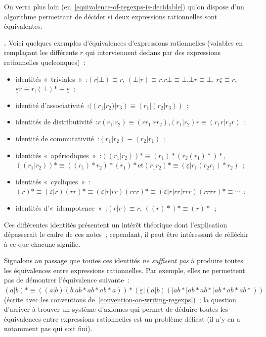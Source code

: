 \documentclass[12pt,a4paper]{article}
\theoremstyle{definition}
\newcommand\thingy{%
\refstepcounter{comcnt}\medskip\noindent\textbf{\thecomcnt.} }
\begin{document}
On verra plus loin (en \ref{equivalence-of-regexps-is-decidable})
qu'on dispose d'un algorithme permettant de décider si deux
expressions rationnelles sont équivalentes.

{\footnotesize\thingy\label{regexp-identities} Voici quelques exemples
  d'équivalences d'expressions rationnelles (valables en remplaçant
  les différents $r$ qui interviennent dedans par des expressions
  rationnelles quelconques) :

\begin{itemize}
\item identités « triviales » :\quad $(r|\bot)\equiv r$,\quad
  $(\bot|r)\equiv r$,\quad $r\bot\equiv \bot$,\quad $\bot r\equiv
  \bot$, \quad $r\underline{\varepsilon} \equiv r$,\quad
  $\underline{\varepsilon}r \equiv r$,\quad $(\bot){*}\equiv
  \underline{\varepsilon}$ ;
\item identité d'associativité :\quad $((r_1|r_2)|r_3)\equiv
  (r_1|(r_2|r_3))$ ;
\item identités de distributivité :\quad $r(r_1|r_2)\equiv
  (rr_1|rr_2)$,\quad $(r_1|r_2)r\equiv (r_1r|r_2r)$ ;
\item identité de commutativité :\quad $(r_1|r_2)\equiv (r_2|r_1)$ ;
\item identités « apériodiques » :\quad $((r_1|r_2)){*} \equiv
  (r_1){*}(r_2(r_1){*}){*}$,\quad $((r_1|r_2)){*} \equiv
  ((r_1){*}r_2){*}(r_1){*}$\quad et\quad $(r_1 r_2){*} \equiv
  (\underline{\varepsilon}|r_1(r_2 r_1){*}r_2)$ ;
\item identités « cycliques » :\quad $(r){*} \equiv
  (\underline{\varepsilon}|r)(rr){*} \equiv
  (\underline{\varepsilon}|r|rr)(rrr){*} \equiv
  (\underline{\varepsilon}|r|rr|rrr)(rrrr){*} \equiv \cdots$ ;
\item identités d'« idempotence » :\quad $(r|r)\equiv r$,\quad
  $((r){*}){*} \equiv (r){*}$ ;
\end{itemize}

Ces différentes identités présentent un intérêt théorique dont
l'explication dépasserait le cadre de ces notes ; cependant, il peut
être intéressant de réfléchir à ce que chacune signifie.

Signalons au passage que toutes ces identités \emph{ne suffisent pas}
à produire toutes les équivalences entre expressions rationnelles.
Par exemple, elles ne permettent pas de démontrer l'équivalence
suivante : $(a|b){*} \equiv
((a|b)(b|ab{*}ab{*}ab{*}a)){*}(\underline{\varepsilon}|(a|b)(|ab{*}|ab{*}ab{*}|ab{*}ab{*}ab{*}))$
(écrite avec les conventions de \ref{convention-on-writing-regexps}) ;
la question d'arriver à trouver un système d'axiomes qui permet de
déduire toutes les équivalences entre expressions rationnelles est un
problème délicat (il n'y en a notamment pas qui soit fini).

\par}
\end{document}
